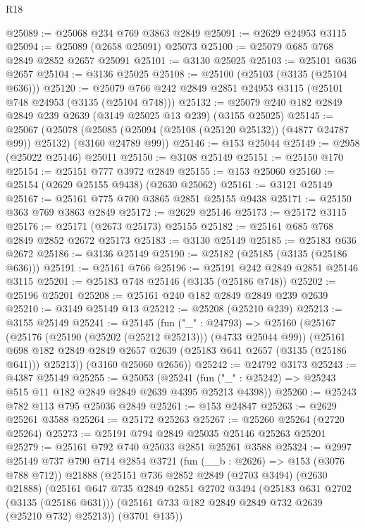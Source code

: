 \begin{lexlean}{R18}
\begin{coremodule}
@25089 := @25068 @234 @769 @3863 @2849
@25091 := @2629 @24953 @3115
@25094 := @25089 (@2658 @25091) @25073
@25100 := @25079 @685 @768 @2849 @2852 @2657 @25091
@25101 := @3130 @25025
@25103 := @25101 @636 @2657
@25104 := @3136 @25025
@25108 := @25100 (@25103 (@3135 (@25104 @636)))
@25120 := @25079 @766 @242 @2849 @2851 @24953 @3115 (@25101 @748 @24953 (@3135 (@25104 @748)))
@25132 := @25079 @240 @182 @2849 @2849 @239 @2639 (@3149 @25025 @13 @239) (@3155 @25025)
@25145 := @25067
    (@25078 (@25085 (@25094 (@25108 (@25120 @25132)) (@4877 @24787 @99)) @25132) (@3160 @24789 @99))
@25146 := @153 @25044
@25149 := @2958 (@25022 @25146) @25011
@25150 := @3108 @25149
@25151 := @25150 @170
@25154 := @25151 @777 @3972 @2849
@25155 := @153 @25060
@25160 := @25154 (@2629 @25155 @9438) (@2630 @25062)
@25161 := @3121 @25149
@25167 := @25161 @775 @700 @3865 @2851 @25155 @9438
@25171 := @25150 @363 @769 @3863 @2849
@25172 := @2629 @25146
@25173 := @25172 @3115
@25176 := @25171 (@2673 @25173) @25155
@25182 := @25161 @685 @768 @2849 @2852 @2672 @25173
@25183 := @3130 @25149
@25185 := @25183 @636 @2672
@25186 := @3136 @25149
@25190 := @25182 (@25185 (@3135 (@25186 @636)))
@25191 := @25161 @766
@25196 := @25191 @242 @2849 @2851 @25146 @3115
@25201 := @25183 @748 @25146 (@3135 (@25186 @748))
@25202 := @25196 @25201
@25208 := @25161 @240 @182 @2849 @2849 @239 @2639
@25210 := @3149 @25149 @13
@25212 := @25208 (@25210 @239)
@25213 := @3155 @25149
@25241 := @25145
    (fun ("_" : @24793) =>
    @25160
      (@25167
        (@25176 (@25190 (@25202 (@25212 @25213))) (@4733 @25044 @99))
        (@25161 @698 @182 @2849 @2849 @2657 @2639 (@25183 @641 @2657 (@3135 (@25186 @641))) @25213))
      (@3160 @25060 @2656))
@25242 := @24792 @3173
@25243 := @4387 @25149
@25255 := @25053
    (@25241 (fun ("_" : @25242) => @25243 @515 @11 @182 @2849 @2849 @2639 @4395 @25213 @4398))
@25260 := @25243 @782 @113 @795 @25036 @2849
@25261 := @153 @24847
@25263 := @2629 @25261 @3588
@25264 := @25172 @25263
@25267 := @25260 @25264 (@2720 @25264)
@25273 := @25191 @794 @2849 @25035 @25146 @25263 @25201
@25279 := @25161 @792 @740 @25033 @2851 @25261 @3588
@25324 := @2997
    @25149
    @737
    @790
    @714
    @2854
    @3721
    (fun (__b : @2626) => @153 (@3076 @788 @712))
    @21888
    (@25151
      @736
      @2852
      @2849
      (@2703 @3494)
      (@2630 @21888)
      (@25161
        @647
        @735
        @2849
        @2851
        @2702
        @3494
        (@25183 @631 @2702 (@3135 (@25186 @631)))
        (@25161 @733 @182 @2849 @2849 @732 @2639 (@25210 @732) @25213))
      (@3701 @135))

\end{coremodule}
\end{lexlean}
